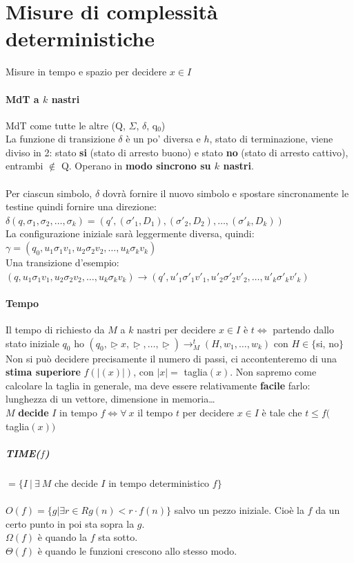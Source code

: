 \documentclass[10pt]{book}
\begin{document}
\section{Misure di complessità deterministiche}
Misure in tempo e spazio per decidere $x \in I$
\paragraph{MdT a $k$ nastri} MdT come tutte le altre (Q, $\Sigma$, $\delta$, q$_0$)\\
La funzione di transizione $\delta$ è un po' diversa e $h$, stato di terminazione, viene diviso in 2: stato \textbf{si} (stato di arresto buono) e stato \textbf{no} (stato di arresto cattivo), entrambi $\not\in$ Q. Operano in \textbf{modo sincrono su $k$ nastri}.\\\\
Per ciascun simbolo, $\delta$ dovrà fornire il nuovo simbolo e spostare sincronamente le testine quindi fornire una direzione: 
$\delta(q, \sigma_1, \sigma_2, \ldots, \sigma_k) = (q', (\sigma'_1, D_1), (\sigma'_2, D_2), \ldots, (\sigma'_k, D_k))$\\
La configurazione iniziale sarà leggermente diversa, quindi: 
$\gamma = (q_0, u_1 \sigma_1 v_1, u_2 \sigma_2 v_2, \ldots, u_k \sigma_k v_k)$\\
Una transizione d'esempio: $(q, u_1\sigma_1 v_1, u_2\sigma_2 v_2, \ldots, u_k \sigma_k v_k) \rightarrow (q', u'_1\sigma'_1 v'_1, u'_2\sigma'_2 v'_2, \ldots, u'_k \sigma'_k v'_k)$\\
\pagebreak
\paragraph{Tempo} Il tempo di richiesto da $M$ a $k$ nastri per decidere $x \in I$ è $t \Leftrightarrow$ partendo dallo stato iniziale $q_0$ ho $(q_0, \underline{\triangleright}x, \underline{\triangleright}, \ldots, \underline{\triangleright}) \longrightarrow_M^t (H, w_1, \ldots, w_k)$ con $H \in \{$si, no$\}$\\
Non si può decidere precisamente il numero di passi, ci accontenteremo di una \textbf{stima superiore} $f(|(x)|)$, con $|x| =$ taglia$(x)$. Non sapremo come calcolare la taglia in generale, ma deve essere relativamente \textbf{facile} farlo: lunghezza di un vettore, dimensione in memoria\ldots\\
$M$ \textbf{decide} $I$ in tempo $f \Leftrightarrow \forall\: x$ il tempo $t$ per decidere $x \in I$ è tale che $t \leq f($taglia$(x))$
\subparagraph{TIME($f$)} $= \{I\:|\: \exists\: M$ che decide $I$ in tempo deterministico $f\}$\\\\
$O(f) = \{g | \exists r \in R  g(n) < r\cdot f(n)\}$ salvo un pezzo iniziale. Cioè la $f$ da un certo punto in poi sta sopra la $g$.\\$\Omega(f)$ è quando la $f$ sta sotto.\\$\Theta(f)$ è quando le funzioni crescono allo stesso modo.
\end{document}
